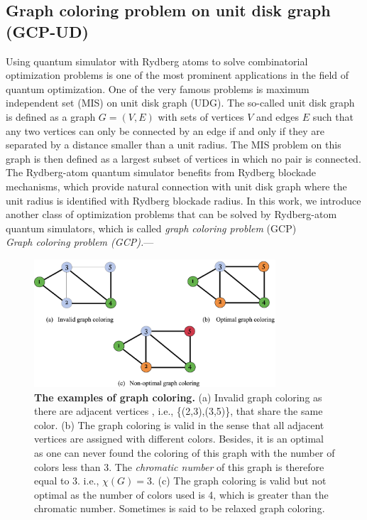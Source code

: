 \documentclass[%
 reprint,
nofootinbib,
 amsmath,amssymb,
 aps,
pra,
floatfix,
]{revtex4-2}
\begin{document}
 
\subsection{Graph coloring problem on unit disk graph (GCP-UD)}

Using quantum simulator with Rydberg atoms to solve combinatorial optimization problems is one of the most prominent applications in the field of quantum optimization. One of the very famous problems is maximum independent set (MIS) on unit disk graph (UDG). The so-called unit disk graph is defined as a graph $G=(V,E)$ with sets of vertices $V$ and edges $E$ such that any two vertices can only be connected by an edge if and only if they are separated by a distance smaller than a unit radius. The MIS problem on this graph is then defined as a largest subset of vertices in which no pair is connected. The Rydberg-atom quantum simulator benefits from Rydberg blockade mechanisms, which provide natural connection with unit disk graph where the unit radius is identified with Rydberg blockade radius. In this work, we introduce another class of optimization problems that can be solved by Rydberg-atom quantum simulators, which is called \emph{graph coloring problem} (GCP) \\

\emph{Graph coloring problem (GCP).}--- 

\begin{figure}[ht!]
    \centering
    \includegraphics[width=9cm]{picture/color_matching.png}
    \caption{\textbf{The examples of graph coloring.} (a) Invalid graph coloring as there are adjacent vertices , i.e., \{(2,3),(3,5)\}, that share the same color. (b) The graph coloring is valid in the sense that all adjacent vertices are assigned with different colors. Besides, it is an optimal as one can never found the coloring of this graph with the number of colors less than 3. The \emph{chromatic number} of this graph is therefore equal to 3. i.e., $\chi(G)=3$. (c) The graph coloring is valid but not optimal as the number of colors used is 4, which is greater than the chromatic number. Sometimes is said to be relaxed graph coloring.} 
    \label{fig:graph_coloring}
\end{figure}
\end{document}
